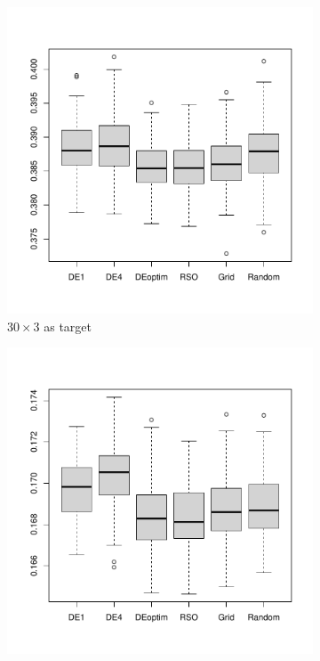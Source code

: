 \documentclass [PhD] {package/uclathes}
\begin{document}
\begin{figure}%
     \centering
     \begin{subfigure}[b]{0.3\textwidth}
         \centering
         \includegraphics[width=\textwidth]{chapters/RSO/pdfs/boxplots2}
         \caption{$30\times 3$ as target}
     \end{subfigure}
     \hfill
     \begin{subfigure}[b]{0.3\textwidth}
         \centering
         \includegraphics[width=\textwidth]{chapters/RSO/pdfs/boxplots3}

\end{subfigure}
\end{figure}
\end{document}
